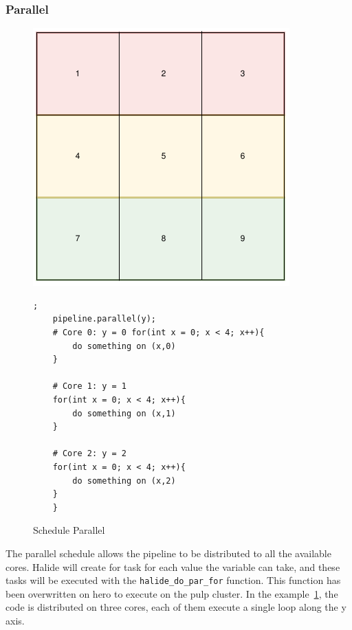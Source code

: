 \subsubsection{Parallel}
\begin{figure}[H]

		\begin{minipage}[c]{\EIW}
			\centering
		\includegraphics[width=\textwidth]{Images/Parallel.png}
		\end{minipage}
		\begin{minipage}[c]{\ECW}
			\centering
			\begin{lstlisting}[label={code:reorder}];
	pipeline.parallel(y);
	# Core 0: y = 0 for(int x = 0; x < 4; x++){
		do something on (x,0)
	}

	# Core 1: y = 1
	for(int x = 0; x < 4; x++){
		do something on (x,1)
	}

	# Core 2: y = 2
	for(int x = 0; x < 4; x++){
		do something on (x,2)
	}
	}
\end{lstlisting}
		\end{minipage}
		\caption{Schedule Parallel}
		\label{schedule:parallel}
\end{figure}

The parallel schedule allows the pipeline to be distributed to all the available cores. Halide will create for task for each value the variable can take, and these tasks will be executed with the \verb|halide_do_par_for| function. This function has been overwritten on hero to execute on the \gls{pulp} cluster. In the example~\ref{schedule:parallel}, the code is distributed on three cores, each of them execute a single loop along the y axis.

